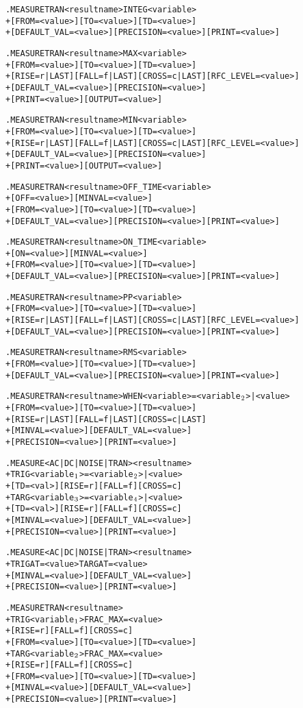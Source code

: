 \begin{Command}
\begin{alltt}
.MEASURE TRAN <result name> INTEG <variable>
+ [FROM=<value>] [TO=<value>] [TD=<value>]
+ [DEFAULT_VAL=<value>] [PRECISION=<value>] [PRINT=<value>]

.MEASURE TRAN <result name> MAX <variable>
+ [FROM=<value>] [TO=<value>] [TD=<value>]
+ [RISE=r|LAST] [FALL=f|LAST] [CROSS=c|LAST] [RFC_LEVEL=<value>]
+ [DEFAULT_VAL=<value>] [PRECISION=<value>] 
+ [PRINT=<value>] [OUTPUT=<value>]

.MEASURE TRAN <result name> MIN <variable>
+ [FROM=<value>] [TO=<value>] [TD=<value>]
+ [RISE=r|LAST] [FALL=f|LAST] [CROSS=c|LAST] [RFC_LEVEL=<value>]
+ [DEFAULT_VAL=<value>] [PRECISION=<value>] 
+ [PRINT=<value>] [OUTPUT=<value>]

.MEASURE TRAN <result name> OFF_TIME <variable>
+ [OFF=<value>] [MINVAL=<value>]
+ [FROM=<value>] [TO=<value>] [TD=<value>]
+ [DEFAULT_VAL=<value>] [PRECISION=<value>] [PRINT=<value>]

.MEASURE TRAN <result name> ON_TIME <variable>
+ [ON=<value>] [MINVAL=<value>]
+ [FROM=<value>] [TO=<value>] [TD=<value>]
+ [DEFAULT_VAL=<value>] [PRECISION=<value>] [PRINT=<value>]

.MEASURE TRAN <result name> PP <variable>
+ [FROM=<value>] [TO=<value>] [TD=<value>]
+ [RISE=r|LAST] [FALL=f|LAST] [CROSS=c|LAST] [RFC_LEVEL=<value>]
+ [DEFAULT_VAL=<value>] [PRECISION=<value>] [PRINT=<value>]

.MEASURE TRAN <result name> RMS <variable>
+ [FROM=<value>] [TO=<value>] [TD=<value>]
+ [DEFAULT_VAL=<value>] [PRECISION=<value>] [PRINT=<value>]

.MEASURE TRAN <result name> WHEN <variable>=<variable\(\sb{2}\)>|<value>
+ [FROM=<value>] [TO=<value>] [TD=<value>] 
+ [RISE=r|LAST] [FALL=f|LAST] [CROSS=c|LAST]
+ [MINVAL=<value>] [DEFAULT_VAL=<value>] 
+ [PRECISION=<value>] [PRINT=<value>]

.MEASURE <AC|DC|NOISE|TRAN> <result name>
+ TRIG <variable\(\sb{1}\)>=<variable\(\sb{2}\)>|<value> 
+ [TD=<val>] [RISE=r] [FALL=f] [CROSS=c]
+ TARG <variable\(\sb{3}\)>=<variable\(\sb{4}\)>|<value> 
+ [TD=<val>] [RISE=r] [FALL=f] [CROSS=c]
+ [MINVAL=<value>] [DEFAULT_VAL=<value>]
+ [PRECISION=<value>] [PRINT=<value>]

.MEASURE <AC|DC|NOISE|TRAN> <result name>
+ TRIG AT=<value> TARG AT=<value> 
+ [MINVAL=<value>] [DEFAULT_VAL=<value>]
+ [PRECISION=<value>] [PRINT=<value>]

.MEASURE TRAN <result name>
+ TRIG <variable\(\sb{1}\)> FRAC\_MAX=<value> 
+ [RISE=r] [FALL=f] [CROSS=c]
+ [FROM=<value>] [TO=<value>] [TD=<value>] 
+ TARG <variable\(\sb{2}\)> FRAC\_MAX=<value> 
+ [RISE=r] [FALL=f] [CROSS=c]
+ [FROM=<value>] [TO=<value>] [TD=<value>] 
+ [MINVAL=<value>] [DEFAULT_VAL=<value>]
+ [PRECISION=<value>] [PRINT=<value>]


\end{alltt}
\end{Command}
